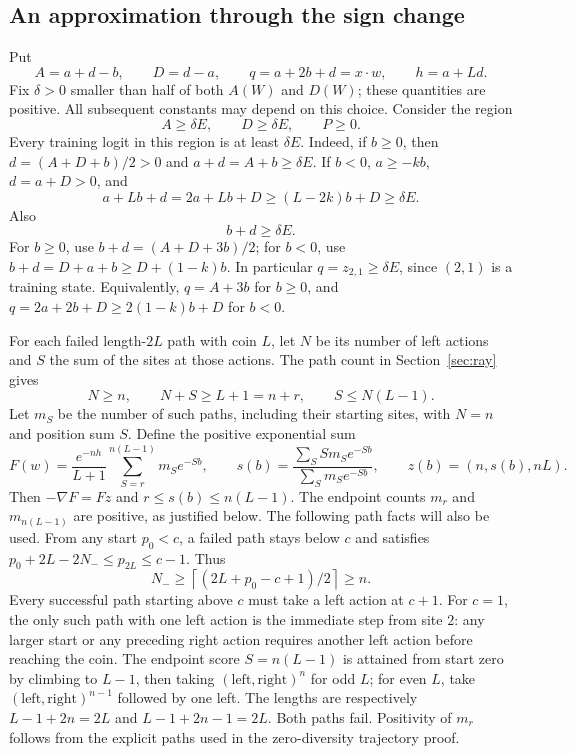 \documentclass[11pt]{article}
\begin{document}
\subsection{An approximation through the sign change}
Put
\[
 A=a+d-b,\qquad D=d-a,\qquad q=a+2b+d=x\cdot w,\qquad h=a+Ld.
\]
Fix $\delta>0$ smaller than half of both $A(W)$ and $D(W)$; these
quantities are positive. All subsequent constants may depend on this choice.
Consider the region
\begin{equation}\label{upper:eq:region}
 A\ge\delta E,\qquad D\ge\delta E,\qquad P\ge0.
\end{equation}
Every training logit in this region is at least $\delta E$. Indeed, if
$b\ge0$, then $d=(A+D+b)/2>0$ and $a+d=A+b\ge\delta E$.
If $b<0$, $a\ge-kb$, $d=a+D>0$, and
\[
 a+Lb+d=2a+Lb+D\ge(L-2k)b+D\ge\delta E.
\]
Also
\begin{equation}\label{upper:eq:bd}
 b+d\ge\delta E.
\end{equation}
For $b\ge0$, use $b+d=(A+D+3b)/2$; for $b<0$, use
$b+d=D+a+b\ge D+(1-k)b$.
In particular $q=z_{2,1}\ge\delta E$, since $(2,1)$ is a training state.
Equivalently, $q=A+3b$ for $b\ge0$, and
$q=2a+2b+D\ge2(1-k)b+D$ for $b<0$.


For each failed length-$2L$ path with coin $L$, let $N$ be its number of
left actions and $S$ the sum of the sites at those actions. The path count
in Section~\ref{sec:ray} gives
\[
 N\ge n,\qquad N+S\ge L+1=n+r,\qquad S\le N(L-1).
\]
Let $m_S$ be the number of such paths, including their starting sites,
with $N=n$ and position sum $S$. Define the positive exponential sum
\begin{equation}\label{upper:eq:F}
 F(w)=\frac{e^{-nh}}{L+1}\sum_{S=r}^{n(L-1)}m_S e^{-Sb},\qquad
 s(b)=\frac{\sum_S S m_S e^{-Sb}}{\sum_S m_S e^{-Sb}},\qquad
 z(b)=(n,s(b),nL).
\end{equation}
Then $-\nabla F=Fz$ and $r\le s(b)\le n(L-1)$. The endpoint counts $m_r$ and $m_{n(L-1)}$ are positive, as justified below.
The following path facts will also be used. From any start $p_0<c$, a
failed path stays below $c$ and satisfies
$p_0+2L-2N_-\le p_{2L}\le c-1$. Thus
\[
 N_-\ge\left\lceil(2L+p_0-c+1)/2\right\rceil\ge n.
\]
Every successful path starting above $c$ must take a left action at $c+1$.
For $c=1$, the only such path with one left action is the immediate step
from site $2$: any larger start or any preceding right action requires
another left action before reaching the coin.
The endpoint score $S=n(L-1)$ is attained from start zero by climbing to
$L-1$, then taking $(\mathrm{left},\mathrm{right})^n$ for odd $L$; for
even $L$, take $(\mathrm{left},\mathrm{right})^{n-1}$ followed by one left.
The lengths are respectively $L-1+2n=2L$ and $L-1+2n-1=2L$.
Both paths fail. Positivity of $m_r$ follows from the explicit paths used
in the zero-diversity trajectory proof.
\end{document}
